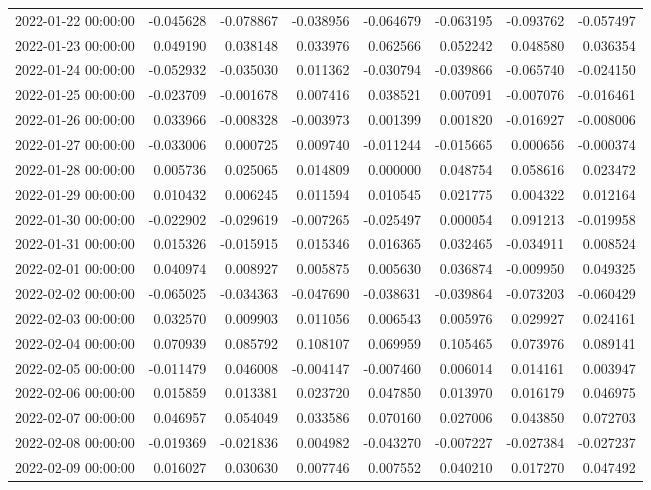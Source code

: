 \begin{tabular}{lrrrrrrr}
2022-01-22 00:00:00 & -0.045628 & -0.078867 & -0.038956 & -0.064679 & -0.063195 & -0.093762 & -0.057497 \\
2022-01-23 00:00:00 & 0.049190 & 0.038148 & 0.033976 & 0.062566 & 0.052242 & 0.048580 & 0.036354 \\
2022-01-24 00:00:00 & -0.052932 & -0.035030 & 0.011362 & -0.030794 & -0.039866 & -0.065740 & -0.024150 \\
2022-01-25 00:00:00 & -0.023709 & -0.001678 & 0.007416 & 0.038521 & 0.007091 & -0.007076 & -0.016461 \\
2022-01-26 00:00:00 & 0.033966 & -0.008328 & -0.003973 & 0.001399 & 0.001820 & -0.016927 & -0.008006 \\
2022-01-27 00:00:00 & -0.033006 & 0.000725 & 0.009740 & -0.011244 & -0.015665 & 0.000656 & -0.000374 \\
2022-01-28 00:00:00 & 0.005736 & 0.025065 & 0.014809 & 0.000000 & 0.048754 & 0.058616 & 0.023472 \\
2022-01-29 00:00:00 & 0.010432 & 0.006245 & 0.011594 & 0.010545 & 0.021775 & 0.004322 & 0.012164 \\
2022-01-30 00:00:00 & -0.022902 & -0.029619 & -0.007265 & -0.025497 & 0.000054 & 0.091213 & -0.019958 \\
2022-01-31 00:00:00 & 0.015326 & -0.015915 & 0.015346 & 0.016365 & 0.032465 & -0.034911 & 0.008524 \\
2022-02-01 00:00:00 & 0.040974 & 0.008927 & 0.005875 & 0.005630 & 0.036874 & -0.009950 & 0.049325 \\
2022-02-02 00:00:00 & -0.065025 & -0.034363 & -0.047690 & -0.038631 & -0.039864 & -0.073203 & -0.060429 \\
2022-02-03 00:00:00 & 0.032570 & 0.009903 & 0.011056 & 0.006543 & 0.005976 & 0.029927 & 0.024161 \\
2022-02-04 00:00:00 & 0.070939 & 0.085792 & 0.108107 & 0.069959 & 0.105465 & 0.073976 & 0.089141 \\
2022-02-05 00:00:00 & -0.011479 & 0.046008 & -0.004147 & -0.007460 & 0.006014 & 0.014161 & 0.003947 \\
2022-02-06 00:00:00 & 0.015859 & 0.013381 & 0.023720 & 0.047850 & 0.013970 & 0.016179 & 0.046975 \\
2022-02-07 00:00:00 & 0.046957 & 0.054049 & 0.033586 & 0.070160 & 0.027006 & 0.043850 & 0.072703 \\
2022-02-08 00:00:00 & -0.019369 & -0.021836 & 0.004982 & -0.043270 & -0.007227 & -0.027384 & -0.027237 \\
2022-02-09 00:00:00 & 0.016027 & 0.030630 & 0.007746 & 0.007552 & 0.040210 & 0.017270 & 0.047492 \\

\end{tabular}
